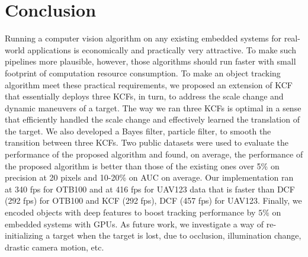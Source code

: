 \documentclass[10pt,twocolumn,letterpaper]{article}
\begin{document}

\section{Conclusion} \label{sc:Conclusion}
Running a computer vision algorithm on any existing embedded systems
for real-world applications is economically and practically very
attractive. To make such pipelines more plausible, however, those
algorithms should run faster with small footprint of computation
resource consumption. To make an object tracking algorithm meet these
practical requirements, we proposed an extension of KCF that
essentially deploys three KCFs, in turn, to address the scale change
and dynamic maneuvers of a target. The way we ran three KCFs is
optimal in a sense that efficiently handled the scale change and
effectively learned the translation of the target. We also developed a
Bayes filter, particle filter, to smooth the transition between three
KCFs. Two public datasets were used to evaluate the
performance of the proposed algorithm and found, on average, the
performance of the proposed algorithm is better than those of the
existing ones over 5\% on precision at 20 pixels and 10-20\% on AUC on
average. Our implementation ran at 340 fps for OTB100 and at 416 fps
for UAV123 data that is faster than DCF (292 fps) for OTB100 and KCF
(292 fps), DCF (457 fps) for UAV123. Finally, we encoded objects
with deep features to boost tracking performance by $5\%$ on embedded 
systems with GPUs. As future work, we investigate a way of re-initializing a target when
the target is lost, due to occlusion, illumination change, drastic
camera motion, etc.

{\small


}
\end{document}
